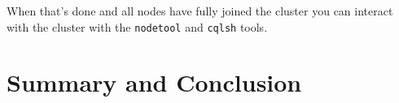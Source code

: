 When that's done and all nodes have fully joined the cluster you can interact with the cluster with the \texttt{nodetool} and \texttt{cqlsh} tools.

\section{Summary and Conclusion}

